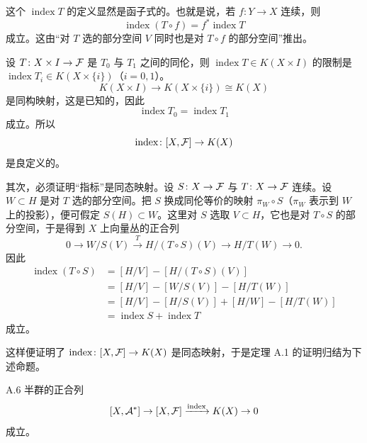 这个 $\operatorname{index}T$ 的定义显然是函子式的。也就是说，若 $f\colon Y\to X$ 连续，则
\[
  \operatorname{index}(T\circ f)=f^*\operatorname{index}T
\]
成立。这由“对 $T$ 选的部分空间 $V$ 同时也是对 $T\circ f$ 的部分空间”推出。

设 $T\colon X\times I\to\mathcal{F}$ 是 $T_0$ 与 $T_1$ 之间的同伦，则 $\operatorname{index}T\in K(X\times I)$ 的限制是 $\operatorname{index}T_i\in K(X\times\{i\})$（$i=0,1$）。
\[
  K(X\times I)\to K(X\times\{i\})\cong K(X)
\]
是同构映射，这是已知的，因此
\[
  \operatorname{index}T_0=\operatorname{index}T_1
\]
成立。所以
\[
  \operatorname{index}\colon[X,\mathcal{F}]\to K(X)
\]
是良定义的。

其次，必须证明“指标”是同态映射。设 $S\colon X\to\mathcal{F}$ 与 $T\colon X\to\mathcal{F}$ 连续。设 $W\subset H$ 是对 $T$ 选的部分空间。把 $S$ 换成同伦等价的映射 $\pi_W\circ S$（$\pi_W$ 表示到 $W$ 上的投影），便可假定 $S(H)\subset W$。这里对 $S$ 选取 $V\subset H$，它也是对 $T\circ S$ 的部分空间，于是得到 $X$ 上向量丛的正合列
\[
  0\to W/S(V)\xrightarrow{T}H/(T\circ S)(V)\to H/T(W)\to 0.
\]
因此
\begin{align*}
  \operatorname{index}(T\circ S)&=[H/V]-[H/(T\circ S)(V)]\\
  &=[H/V]-[W/S(V)]-[H/T(W)]\\
  &=[H/V]-[H/S(V)]+[H/W]-[H/T(W)]\\
  &=\operatorname{index}S+\operatorname{index}T
\end{align*}
成立。

这样便证明了 $\operatorname{index}\colon[X,\mathcal{F}]\to K(X)$ 是同态映射，于是定理 A.1 的证明归结为下述命题。

\begin{proposition*}{A.6}
  半群的正合列
  \[
    [X,\mathcal{A}^*]\to[X,\mathcal{F}]\xrightarrow{\operatorname{index}}K(X)\to0
  \]
  成立。
\end{proposition*}

